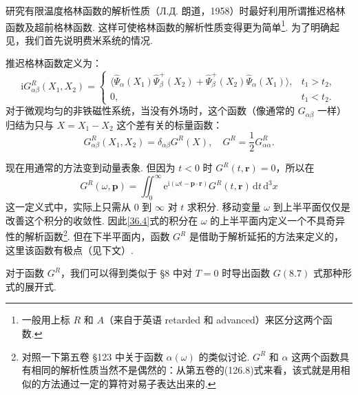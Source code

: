 研究有限温度格林函数的解析性质（Л.Д. 朗道，1958）时最好利用所谓推迟格林函数及超前格林函数. 这样可使格林函数的解析性质变得更为简单\footnote{一般用上标 $R$ 和 $A$（来自于英语 retarded 和 advanced）来区分这两个函数.}. 为了明确起见，我们首先说明费米系统的情况.

{\heiti 推迟格林函数定义为：}
\begin{equation}
\mathrm{i}G^{R}_{\alpha\beta}(X_1,X_2)=
\left\{\begin{array}{ll}
\langle\hat\Psi_\alpha(X_1)\hat\Psi^{+}_\beta(X_2)+\hat\Psi^{+}_\beta(X_2)\hat\Psi_\alpha(X_1)\rangle, & t_1>t_2,\\[0.2em]
0, & t_1<t_2.
\end{array}\right.
\label{36.2}
\end{equation}
对于微观均匀的非铁磁性系统，当没有外场时，这个函数（像通常的 $G_{\alpha\beta}$ 一样）归结为只与 $X=X_1-X_2$ 这个差有关的标量函数：
\begin{equation}
G^{R}_{\alpha\beta}(X_1,X_2)=\delta_{\alpha\beta}G^{R}(X),\quad
G^{R}=\frac{1}{2}G^{R}_{\alpha\alpha}.
\label{36.3}
\end{equation}

现在用通常的方法变到动量表象. 但因为 $t<0$ 时 $G^{R}(t,\bm r)=0$，所以在
\begin{equation}
G^{R}(\omega,\bm p)=\iint_{0}^{\infty}\mathrm{e}^{\mathrm{i}(\omega t-\bm p\cdot\bm r)}G^{R}(t,\bm r)\,\mathrm{d}t\,\mathrm{d}^{3}x
\label{36.4}
\end{equation}
这一定义式中，实际上只需从 0 到 $\infty$ 对 $t$ 求积分. 移动变量 $\omega$ 到上半平面仅仅是改善这个积分的收敛性. 因此\eqref{36.4}式的积分在 $\omega$ 的上半平面内定义一个不具奇异性的解析函数\footnote{对照一下第五卷 §123 中关于函数 $\alpha(\omega)$ 的类似讨论. $G^{R}$ 和 $\alpha$ 这两个函数具有相同的解析性质当然不是偶然的：从第五卷的(126.8)式来看，该式就是用相似的方法通过一定的算符对易子表达出来的.}. 但在下半平面内，函数 $G^{R}$ 是借助于解析延拓的方法来定义的，这里该函数有极点（见下文）.

对于函数 $G^{R}$，我们可以得到类似于 §8 中对 $T=0$ 时导出函数 $G(8.7)$ 式那种形式的展开式.

